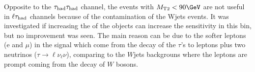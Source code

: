 Opposite to the $\tau_{\rm had}\tau_{\rm had}$ channel, the events with $\mttwo<90 \GeV$ are not useful in $\ell\tau_{\rm had}$ channels because of the contamination of 
the Wjets events. It was investigated if increasing the \pt of the objects can increase the sensitivity in this bin, but no improvement was seen.
The main reason can be due to the softer leptons (e and $\mu$) in the signal which come from the decay of the $\tau$'s 
to leptons plus two neutrinos ($\tau\rightarrow\ell\nu_{\ell}\nu$), 
comparing to the $W$jets backgrouns where the leptons are prompt coming from the decay of $W$ bosons.
